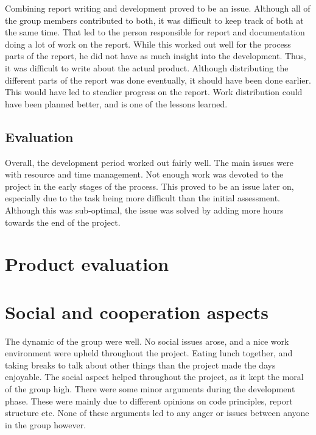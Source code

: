 Combining report writing and development proved to be an issue. Although all of the group members contributed to both, it was difficult to keep track of both at the same time. That led to the person responsible for report and documentation doing a lot of work on the report. While this worked out well for the process parts of the report, he did not have as much insight into the development. Thus, it was difficult to write about the actual product. Although distributing the different parts of the report was done eventually, it should have been done earlier. This would have led to steadier progress on the report. Work distribution could have been planned better, and is one of the lessons learned.

\subsection{Evaluation}
\label{subsec:project_evaluation-development-evaluation}

Overall, the development period worked out fairly well. The main issues were with resource and time management. Not enough work was devoted to the project in the early stages of the process. This proved to be an issue later on, especially due to the task being more difficult than the initial assessment. Although this was sub-optimal, the issue was solved by adding more hours towards the end of the project.

\section{Product evaluation}
\label{sec:project_evaluation-product_evaluation}

\section{Social and cooperation aspects}
\label{sec:Social_and_cooperation_aspects}

The dynamic of the group were well. No social issues arose, and a nice work environment were upheld throughout the project. Eating lunch together, and taking breaks to talk about other things than the project made the days enjoyable. The social aspect helped throughout the project, as it kept the moral of the group high. There were some minor arguments during the development phase. These were mainly due to different opinions on code principles, report structure etc. None of these arguments led to any anger or issues between anyone in the group however.

